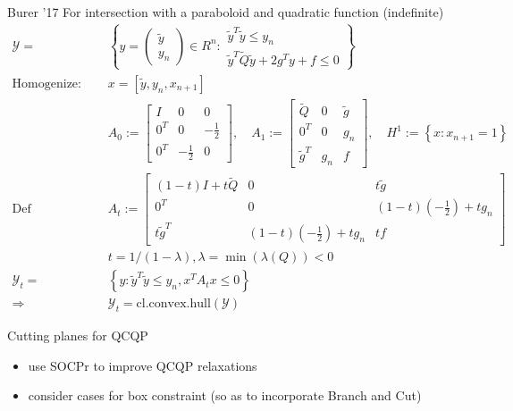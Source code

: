 \begin{frame}{Burer '17}
  For intersection with a paraboloid and quadratic function (indefinite)
  \begin{align*}
    \mathcal Y         = \quad  & \left\{y=\left(\begin{array}{c}
        \tilde{y} \\
        y_{n}
      \end{array}\right) \in R ^{n}: \begin{array}{c}
      \tilde{y}^{T} \tilde{y} \leq y_{n} \\
      \tilde{y}^{T} \tilde{Q} \tilde{y}+2 g^{T} y+f \leq 0
    \end{array}\right\}                      \\
    \textrm{Homogenize: } \quad & x = [\tilde y, y_n, x_{n+1}]                                                                                         \\
                                & A_{0}:=\begin{bmatrix}
      I     & 0            & 0            \\
      0^{T} & 0            & -\frac{1}{2} \\
      0^{T} & -\frac{1}{2} & 0
    \end{bmatrix}, \quad A_{1}:=\begin{bmatrix}
      \tilde{Q}     & 0     & \tilde{g} \\
      0^{T}         & 0     & g_{n}     \\
      \tilde{g}^{T} & g_{n} & f
    \end{bmatrix}, \quad H^{1}:=\left\{x: x_{n+1}=1\right\} \\
    \textrm{Def} \quad          & A_{t}:=\begin{bmatrix}
      (1-t) I+t \tilde{Q} & 0                                      & t \tilde{g}                            \\
      0^{T}               & 0                                      & (1-t)\left(-\frac{1}{2}\right)+t g_{n} \\
      t \tilde{g}^{T}     & (1-t)\left(-\frac{1}{2}\right)+t g_{n} & t f
    \end{bmatrix}                                                                                    \\
                                & t = 1 /(1-\lambda), \lambda = \min(\lambda(Q)) < 0                                                                   \\
    \mathcal Y_t = \quad        & \left\{y : \tilde{y}^{T} \tilde{y} \leq y_{n}, x^TA_t x \le 0 \right\}                                               \\
    \Rightarrow \quad           & \mathcal Y_t = \textrm{cl.convex.hull}( \mathcal Y)
  \end{align*}
\end{frame}
\begin{frame}{Cutting planes for QCQP}
  \begin{itemize}
    \item use SOCPr to improve QCQP relaxations
    \item consider cases for box constraint (so as to incorporate Branch and Cut)
  \end{itemize}
\end{frame}
